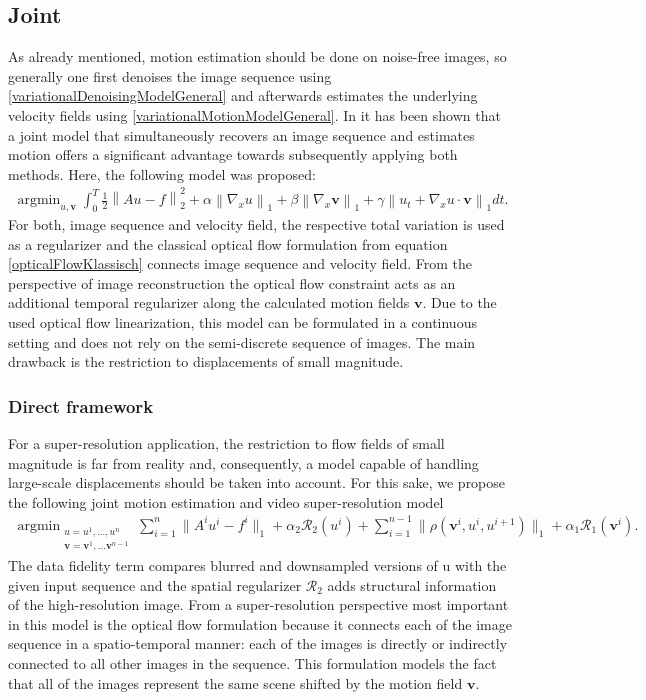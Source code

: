 \documentclass[final,leqno,onefignum,onetabnum]{article}
\newcommand{\1}[1]{\mathds{1}_{#1}}
\DeclareMathOperator*{\argmin}{\arg \min}%
\begin{document}
\subsection{Joint}
As already mentioned, motion estimation should be done on noise-free images, so generally one first denoises the image sequence using \eqref{variationalDenoisingModelGeneral} and afterwards estimates the underlying velocity fields using \eqref{variationalMotionModelGeneral}. In \cite{dirks} it has been shown that a joint model that simultaneously recovers an image sequence and estimates motion offers a significant advantage towards subsequently applying both methods. Here, the following model was proposed:
\begin{align}
	\argmin_{u,\boldsymbol{v}} \int_0^T \frac{1}{2}\left\|Au-f\right\|_2^2 + \alpha \left\|\nabla_x u\right\|_1 + \beta\left\|\nabla_x \boldsymbol{v}\right\|_1 + \gamma \left\|u_t+\nabla_x u\cdot\boldsymbol{v}\right\|_1 dt.
	\label{oldJointModel}
\end{align}
For both, image sequence and velocity field, the respective total variation is used as a regularizer and the classical optical flow formulation from equation \ref{opticalFlowKlassisch} connects image sequence and velocity field. From the perspective of image reconstruction the optical flow constraint acts as an additional temporal regularizer along the calculated motion fields $\boldsymbol{v}$. Due to the used optical flow linearization, this model can be formulated in a continuous setting and does not rely on the semi-discrete sequence of images. The main drawback is the restriction to displacements of small magnitude. \\

\subsubsection{Direct framework}
For a super-resolution application, the restriction to flow fields of small magnitude is far from reality and, consequently, a model capable of handling large-scale displacements should be taken into account. For this sake, we propose the following joint motion estimation and video super-resolution model
\begin{align}
	\argmin_{\substack{u = u^1,\ldots, u^{n}\\\boldsymbol{v}=\boldsymbol{v}^1,\ldots\boldsymbol{v}^{n-1}}} \sum_{i=1}^{n} \|A^iu^i-f^i \|_1 + \alpha_2 \mathcal{R}_2(u^i) + \sum_{i=1}^{n-1} \| \rho(\boldsymbol{v}^i,u^{i},u^{i+1}) \|_1 + \alpha_1 \mathcal{R}_1(\boldsymbol{v}^i).
	\label{jointLargeScaleModel}
\end{align}
The data fidelity term compares blurred and downsampled versions of u with the given input sequence and the spatial regularizer $\mathcal{R}_2$ adds structural information of the high-resolution image. From a super-resolution perspective most important in this model is the optical flow formulation because it connects each of the image sequence in a spatio-temporal manner: each of the images is directly or indirectly connected to all other images in the sequence. This formulation models the fact that all of the images represent the same scene shifted by the motion field $\boldsymbol{v}$.
\end{document}
